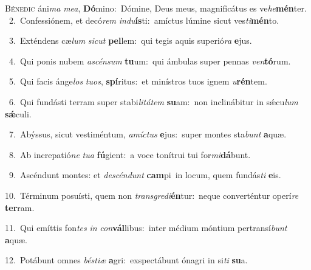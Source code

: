 \lettrine{\initial\textcolor{\initialcolor}{B}}{énedic} áni\textit{ma} \textit{me}\-\textit{a}, \textbf{Dó}\-mino:~\star Dómine, Deus meus, magnificátus es ve\-\textit{he}\-\textbf{mén}ter.\\
{\numbfont\textcolor{\numbcolor}{~2.}}~Confessiónem, et decó\textit{rem} \textit{ind}\-\textit{u}\textbf{ís}ti:~\star amíctus lúmine sicut ves\-\textit{ti}\-\textbf{mén}to.\par
{\numbfont\textcolor{\numbcolor}{~3.}}~Exténdens cæ\textit{lum} \textit{sic}\-\textit{ut} \textbf{pel}\-lem:~\star qui tegis aquis superió\textit{ra} \textbf{e}\-jus.\par
{\numbfont\textcolor{\numbcolor}{~4.}}~Qui ponis nubem \textit{a}\-\textit{scén}\textit{sum} \textbf{tu}\-um:~\star qui ámbulas super pennas \textit{ven}\-\textbf{tó}rum.\par
{\numbfont\textcolor{\numbcolor}{~5.}}~Qui facis ánge\textit{los} \textit{tu}\-\textit{os}, \textbf{spí}\-ritus:~\star et minístros tuos ignem \textit{u}\-\textbf{rén}tem.\par
{\numbfont\textcolor{\numbcolor}{~6.}}~Qui fundásti terram super stabi\-\textit{li}\-\textit{tá}\textit{tem} \textbf{su}\-am:~\star non inclinábitur in sǽcu\textit{lum} \textbf{sǽ}\-culi.\par
{\numbfont\textcolor{\numbcolor}{~7.}}~Abýssus, sicut vestiméntum, \textit{a}\-\textit{míc}\textit{tus} \textbf{e}\-jus:~\star super montes sta\textit{bunt} \textbf{a}\-quæ.\par
{\numbfont\textcolor{\numbcolor}{~8.}}~Ab increpatió\textit{ne} \textit{tu}\-\textit{a} \textbf{fú}\-gient:~\star a voce tonítrui tui for\-\textit{mi}\-\textbf{dá}bunt.\par
{\numbfont\textcolor{\numbcolor}{~9.}}~Ascéndunt montes: et \textit{de}\-\textit{scén}\textit{dunt} \textbf{cam}\-pi~\star in locum, quem fundás\textit{ti} \textbf{e}\-is.\par
{\numbfont\textcolor{\numbcolor}{10.}}~Términum posuísti, quem non \textit{trans}\-\textit{gre}\textit{di}\textbf{én}tur:~\star neque converténtur operí\textit{re} \textbf{ter}\-ram.\par
{\numbfont\textcolor{\numbcolor}{11.}}~Qui emíttis fon\textit{tes} \textit{in} \textit{con}\-\textbf{vál}libus:~\star inter médium móntium pertransí\textit{bunt} \textbf{a}\-quæ.\par
{\numbfont\textcolor{\numbcolor}{12.}}~Potábunt omnes \textit{bés}\-\textit{ti}\textit{æ} \textbf{a}\-gri:~\star exspectábunt ónagri in si\textit{ti} \textbf{su}\-a.\par
